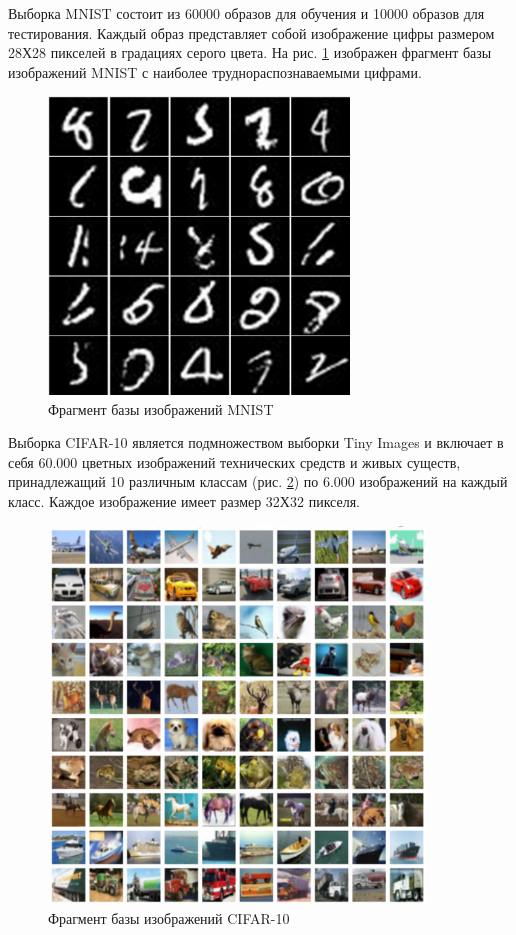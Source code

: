 Выборка MNIST состоит из 60000 образов для обучения и 10000 образов для тестирования. Каждый образ представляет собой изображение цифры размером 28Х28 пикселей в градациях серого цвета. На рис. \ref{fig:mnist_example} изображен фрагмент базы изображений MNIST с наиболее труднораспознаваемыми цифрами.

\begin{figure}[h]
	\begin{center}
		\includegraphics[width=8cm]{man-source/images/ch3/pic3-12.pdf}
		\caption{Фрагмент базы изображений MNIST}		
		\label{fig:mnist_example}
	\end{center}
\end{figure}

Выборка CIFAR-10 \cite{krizhevsky2009learning} является подмножеством выборки Tiny Images \cite{torralba2008} и включает в себя 60.000 цветных изображений технических средств и живых существ, принадлежащий 10 различным классам (рис. \ref{fig:cifar_dataset}) по 6.000 изображений на каждый класс. Каждое изображение имеет размер 32Х32 пикселя.

\begin{figure}[h]
	\begin{center}
		\includegraphics[width=10cm]{man-source/images/ch3/pic3-2.pdf}
		\caption{Фрагмент базы изображений CIFAR-10}				
		\label{fig:cifar_dataset}
	\end{center}
\end{figure}


